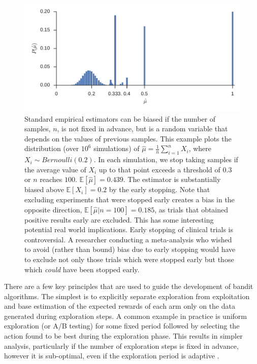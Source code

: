 \documentclass[11pt,a4paper,oneside]{book}
\newcommand{\E}[1]{\mathbb E\left[{#1}\right]}
\theoremstyle{plain}
\theoremstyle{definition}
\begin{document}
\begin{figure}[h]
\centering
\includegraphics[scale=1]{extreme_early_stopping}
\caption{Standard empirical estimators can be biased if the number of samples, $n$, is not fixed in advance, but is a random variable that depends on the values of previous samples. This example plots the distribution (over $10^6$ simulations) of $\hat{\mu} = \frac{1}{n}\sum_{i=1}^n X_i$, where $X_i \sim Bernoulli(0.2)$. In each simulation, we stop taking samples if the average value of $X_i$ up to that point exceeds a threshold of $0.3$ or $n$ reaches $100$. $\E{\hat{\mu}} = 0.439$. The estimator is substantially biased above $\E{X_i} = 0.2$ by the early stopping. Note that excluding experiments that were stopped early creates a bias in the opposite direction, $\E{\hat{\mu}|n=100} = 0.185$, as trials that obtained positive results early are excluded. This has some interesting potential real world implications. Early stopping of clinical trials is controversial. A researcher conducting a meta-analysis who wished to avoid (rather than bound) bias due to early stopping would have to exclude not only those trials which were stopped early but those which \emph{could} have been stopped early.}
\label{fig:early_stopping}
\end{figure}

There are a few key principles that are used to guide the development of bandit algorithms. The simplest is to explicitly separate exploration from exploitation and base estimation of the expected rewards of each arm only on the data generated during exploration steps. A common example in practice is uniform exploration (or A/B testing) for some fixed period followed by selecting the action found to be best during the exploration phase. This results in simpler analysis, particularly if the number of exploration steps is fixed in advance, however it is sub-optimal, even if the exploration period is adaptive \citep{NIPS2016_6179}. 
\end{document}
